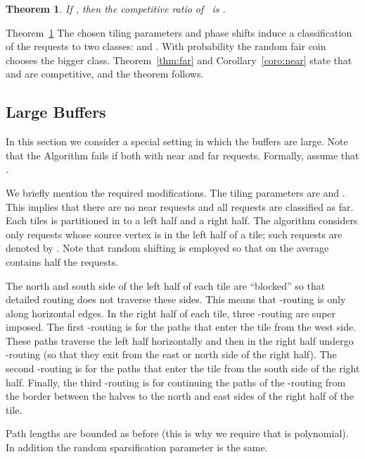 \documentclass[11pt]{article}
\newtheorem{theorem}{Theorem}
\newcommand{\alg}{\text{\sc{alg}}}
\newenvironment{proof sketch}[1]{\noindent {\emph{Proof sketch of #1:}}}{\hfill \qed}
\begin{document}
\begin{theorem}\label{thm:algrand}
  If , then the competitive ratio of \alg\ is .
\end{theorem}
\begin{proof sketch}{Theorem~\ref{thm:algrand}}
    The chosen tiling parameters and phase shifts induce a classification of the requests to two classes:  and .
    With probability  the random fair coin  chooses the bigger class.
    Theorem~\ref{thm:far} and Corollary~\ref{coro:near} state that  and  are  competitive, and the theorem follows.
\end{proof sketch}

\subsection{Large Buffers} \label{sec:largeB}

In this section we consider a special setting in which the buffers are large.
Note that the Algorithm fails if  both with near and far requests.
Formally, assume that .

We briefly mention the required modifications.  The tiling parameters are 
and .  This implies that there are no near requests and all requests are
classified as far.  Each tiles is partitioned in to a left half and a right half.
The algorithm considers only requests whose source vertex is in the left half of a
tile; such requests are denoted by . Note that random shifting is employed so
that on the average  contains half the requests.

The north and south side of the left half of each tile are ``blocked'' so that
detailed routing does not traverse these sides.  This means that -routing is only
along horizontal edges.  In the right half of each tile, three -routing are super
imposed. The first -routing is for the paths that enter the tile from the west
side. These paths traverse the left half horizontally and then in the right half
undergo -routing (so that they exit from the east or north side of the right
half).  The second -routing is for the paths that enter the tile from the south
side of the right half. Finally, the third -routing is for continuing the paths of
the -routing from the border between the halves to the north and east sides of
the right half of the tile.

Path lengths are bounded as before (this is why we require
that  is polynomial).  In addition the random
sparsification parameter  is the same.
\end{document}
